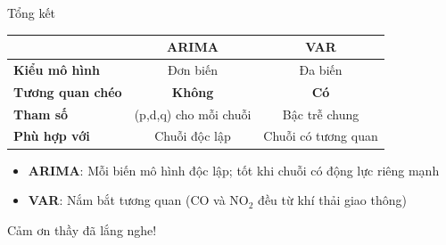\documentclass[serif, aspectratio=169]{beamer}
\newcommand{\highlight}[1]{\textbf{\color{hkustblue}#1}}
\newcommand{\red}[1]{\textbf{\color{hkustred}#1}}
\newcommand{\green}[1]{\textbf{\color{codegreen}#1}}
\begin{document}
\begin{frame}{Tổng kết}
    \begin{center}
        \begin{tabular}{|l|c|c|}
            \hline
            & \textbf{ARIMA} & \textbf{VAR} \\ \hline
            \textbf{Kiểu mô hình} & Đơn biến & Đa biến \\ \hline
            \textbf{Tương quan chéo} & \red{Không} & \green{Có} \\ \hline
            \textbf{Tham số} & (p,d,q) cho mỗi chuỗi & Bậc trễ chung \\ \hline
            \textbf{Phù hợp với} & Chuỗi độc lập & Chuỗi có tương quan \\ \hline
        \end{tabular}
    \end{center}

    \vspace{0.5cm}
    \begin{itemize}
        \item \highlight{ARIMA}: Mỗi biến mô hình độc lập; tốt khi chuỗi có động lực riêng mạnh
        \item \highlight{VAR}: Nắm bắt tương quan (CO và NO$_2$ đều từ khí thải giao thông)
    \end{itemize}
\end{frame}

\begin{frame}
    \begin{center}
        \vspace{1cm}
        {\Huge \color{hkustred} Cảm ơn thầy đã lắng nghe!}
    \end{center}
\end{frame}
\end{document}
